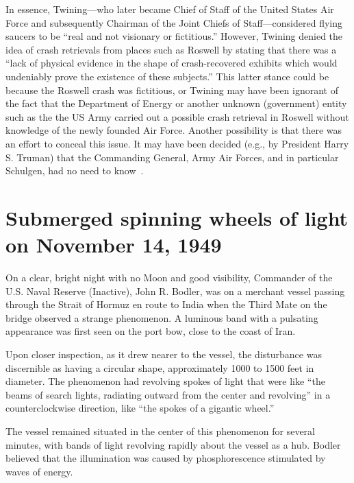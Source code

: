 In essence, Twining---who later became Chief of Staff of the United States Air Force and subsequently Chairman of the Joint Chiefs of
Staff---considered flying saucers to be ``real and not visionary or fictitious.''
However, Twining denied the idea of crash retrievals from places such as Roswell by stating that there was a
``lack of physical evidence in the shape of crash-recovered exhibits which would undeniably prove the existence of these subjects.''
This latter stance could be because the Roswell crash was fictitious,
or Twining may have been ignorant of the fact that the Department of Energy or another unknown (government) entity such as the
the US Army carried out a possible crash retrieval in Roswell without knowledge of the newly founded Air Force. Another possibility is that there was an effort to conceal this issue. It may have been decided (e.g., by President Harry S. Truman) that the Commanding General, Army Air Forces, and in particular Schulgen, had no need to know~\cite[p.~44]{Dolan2002Jun}.


\section{Submerged spinning wheels of light on November 14, 1949}\label{2023-UFO-part-History-chapter-post-1945-pre-1953-sswl}



On a clear, bright night with no Moon and good visibility, Commander of the U.S. Naval Reserve (Inactive), John R. Bodler, was on a merchant vessel passing through the Strait of Hormuz en route to India when the Third Mate on the bridge observed a strange phenomenon. A luminous band with a pulsating appearance was first seen on the port bow, close to the coast of Iran.

Upon closer inspection, as it drew nearer to the vessel, the disturbance was discernible as having a circular shape, approximately 1000 to 1500 feet in diameter.
The phenomenon had revolving spokes of light that were like ``the beams of search lights, radiating outward from the center and revolving'' in a counterclockwise direction, like ``the spokes of a gigantic wheel.''

The vessel remained situated in the center of this phenomenon for several minutes, with bands of light revolving rapidly about the vessel as a hub. Bodler believed that the illumination was caused by phosphorescence stimulated by waves of energy.

